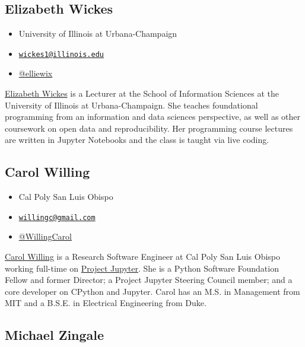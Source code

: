 \documentclass[]{book}
\providecommand{\tightlist}{%
  \setlength{\itemsep}{0pt}\setlength{\parskip}{0pt}}
\begin{document}
\subsection*{Elizabeth Wickes}\label{elizabeth-wickes}

\begin{itemize}
\tightlist
\item
  University of Illinois at Urbana-Champaign
\item
  \href{mailto:wickes1@illinois.edu}{\nolinkurl{wickes1@illinois.edu}}
\item
  \href{https://twitter.com/elliewix}{@elliewix}
\end{itemize}

\href{https://ischool.illinois.edu/people/elizabeth-wickes}{Elizabeth
Wickes} is a Lecturer at the School of Information Sciences at the
University of Illinois at Urbana-Champaign. She teaches foundational
programming from an information and data sciences perspective, as well
as other coursework on open data and reproducibility. Her programming
course lectures are written in Jupyter Notebooks and the class is taught
via live coding.

\subsection*{Carol Willing}\label{carol-willing}

\begin{itemize}
\tightlist
\item
  Cal Poly San Luis Obispo
\item
  \href{mailto:willingc@gmail.com}{\nolinkurl{willingc@gmail.com}}
\item
  \href{https://twitter.com/WillingCarol}{@WillingCarol}
\end{itemize}

\href{https://www.willingconsulting.com/about/}{Carol Willing} is a
Research Software Engineer at Cal Poly San Luis Obispo working full-time
on \href{https://jupyter.org/}{Project Jupyter}. She is a Python
Software Foundation Fellow and former Director; a Project Jupyter
Steering Council member; and a core developer on CPython and Jupyter.
Carol has an M.S. in Management from MIT and a B.S.E. in Electrical
Engineering from Duke.

\subsection*{Michael Zingale}\label{michael-zingale}
\end{document}
